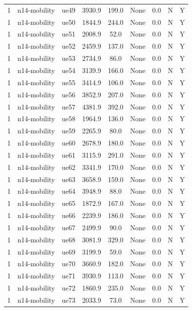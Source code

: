 \begin{table}[ht]
\begin{tabular}{|c|c|c|c|c|c|c|c|c|}
1 & n14-mobility & ue49 & 3930.9 & 199.0 & None & 0.0 & N & Y \\
1 & n14-mobility & ue50 & 1844.9 & 244.0 & None & 0.0 & N & Y \\
1 & n14-mobility & ue51 & 2008.9 & 52.0 & None & 0.0 & N & Y \\
1 & n14-mobility & ue52 & 2459.9 & 137.0 & None & 0.0 & N & Y \\
1 & n14-mobility & ue53 & 2734.9 & 86.0 & None & 0.0 & N & Y \\
1 & n14-mobility & ue54 & 3139.9 & 166.0 & None & 0.0 & N & Y \\
1 & n14-mobility & ue55 & 3414.9 & 106.0 & None & 0.0 & N & Y \\
1 & n14-mobility & ue56 & 3852.9 & 207.0 & None & 0.0 & N & Y \\
1 & n14-mobility & ue57 & 4381.9 & 392.0 & None & 0.0 & N & Y \\
1 & n14-mobility & ue58 & 1964.9 & 136.0 & None & 0.0 & N & Y \\
1 & n14-mobility & ue59 & 2265.9 & 80.0 & None & 0.0 & N & Y \\
1 & n14-mobility & ue60 & 2678.9 & 180.0 & None & 0.0 & N & Y \\
1 & n14-mobility & ue61 & 3115.9 & 291.0 & None & 0.0 & N & Y \\
1 & n14-mobility & ue62 & 3341.9 & 170.0 & None & 0.0 & N & Y \\
1 & n14-mobility & ue63 & 3658.9 & 159.0 & None & 0.0 & N & Y \\
1 & n14-mobility & ue64 & 3948.9 & 88.0 & None & 0.0 & N & Y \\
1 & n14-mobility & ue65 & 1872.9 & 167.0 & None & 0.0 & N & Y \\
1 & n14-mobility & ue66 & 2239.9 & 186.0 & None & 0.0 & N & Y \\
1 & n14-mobility & ue67 & 2499.9 & 90.0 & None & 0.0 & N & Y \\
1 & n14-mobility & ue68 & 3081.9 & 329.0 & None & 0.0 & N & Y \\
1 & n14-mobility & ue69 & 3199.9 & 59.0 & None & 0.0 & N & Y \\
1 & n14-mobility & ue70 & 3660.9 & 182.0 & None & 0.0 & N & Y \\
1 & n14-mobility & ue71 & 3930.9 & 113.0 & None & 0.0 & N & Y \\
1 & n14-mobility & ue72 & 1860.9 & 235.0 & None & 0.0 & N & Y \\
1 & n14-mobility & ue73 & 2033.9 & 73.0 & None & 0.0 & N & Y \\

\end{tabular}
\end{table}
